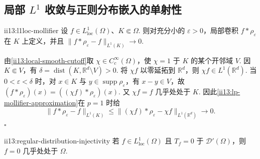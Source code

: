 \subsection{局部 \texorpdfstring{\(\displaystyle L^1\)}{L1} 收敛与正则分布嵌入的单射性}

\begin{FALemma}{ii13:l1loc-mollifier}
设 \(\displaystyle f\in L^1_{\mathrm{loc}}(\Omega)\)、\(\displaystyle K\Subset\Omega\). 则对充分小的 \(\displaystyle\varepsilon>0\)，局部卷积 \(\displaystyle f*\rho_\varepsilon\) 在 \(\displaystyle K\) 上定义，并且 \(\displaystyle \|f*\rho_\varepsilon-f\|_{L^1(K)} \longrightarrow0.\)
\end{FALemma}

\begin{FAProof}
由\autoref{ii13:local-smooth-cutoff}取 \(\displaystyle\chi\in C_c^\infty(\Omega)\)，使 \(\displaystyle\chi=1\) 于 \(\displaystyle K\) 的某个开邻域 \(\displaystyle V\). 因 \(\displaystyle K\Subset V\)，有 \(\displaystyle\delta=\operatorname{dist}(K,\mathbb R^d\setminus V)>0\). 将 \(\displaystyle\chi f\) 以零延拓到 \(\displaystyle\mathbb R^d\)，则 \(\displaystyle\chi f\in L^1(\mathbb R^d)\). 当 \(\displaystyle0<\varepsilon<\delta\) 时，对 \(\displaystyle x\in K\) 与 \(\displaystyle y\in\operatorname{supp}\rho_\varepsilon\)，有 \(\displaystyle x-y\in V\)，故 \(\displaystyle (f*\rho_\varepsilon)(x) =((\chi f)*\rho_\varepsilon)(x).\)
又 \(\displaystyle\chi f=f\) 几乎处处于 \(\displaystyle K\). 因此\autoref{ii13:lp-mollifier-approximation}在 \(\displaystyle p=1\) 时给
\[
\|f*\rho_\varepsilon-f\|_{L^1(K)}
\leqslant
\|(\chi f)*\rho_\varepsilon-\chi f\|_{L^1(\mathbb R^d)}
\longrightarrow0.\]
\hfill\(\square\)


\end{FAProof}

\begin{FATheorem}[B][正则分布的单射性]{ii13:regular-distribution-injectivity}
若 \(\displaystyle f\in L^1_{\mathrm{loc}}(\Omega)\) 且 \(\displaystyle T_f=0\) 于 \(\displaystyle\mathcal D'(\Omega)\)，则 \(\displaystyle f=0\) 几乎处处于 \(\displaystyle\Omega\).
\end{FATheorem}

